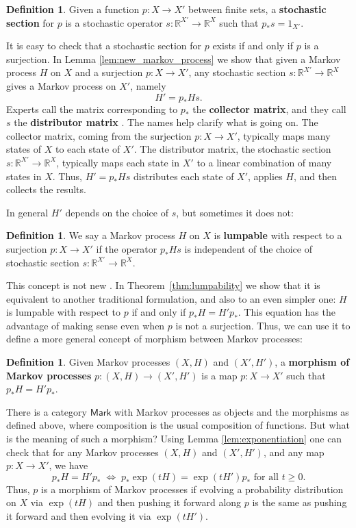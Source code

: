 \documentclass[oneside,final]{ucr}
\theoremstyle{definition}
\newtheorem{definition}[theorem]{Definition}
\newcommand{\maps}{\colon}
\newcommand{\R}{\mathbb{R}}
\newcommand{\define}[1]{{\bf \boldmath #1}}
\newcommand{\Mark}{\mathsf{Mark}}
\begin{document}
{\begin{definition}
Given a function $p \maps X \to X'$ between finite sets, a \define{stochastic section} for
$p$ is a stochastic operator $s \maps \R^{X'} \to \R^X$ such that $p_* s = 1_{X'}$. 
\end{definition}

It is easy to check that a stochastic section for $p$ exists if and only if $p$ is a surjection.  In Lemma \ref{lem:new_markov_process} we show that given a Markov process $H$ on $X$ and a surjection $p \maps X \to X'$, any stochastic section $s \maps \R^{X'} \to \R^X$ gives a Markov process on $X'$, namely
\[            H' =  p_* H s. \]
Experts call the matrix corresponding to $p_*$ the \define{collector matrix}, and they call $s$ the \define{distributor matrix} \cite{Buchholz}.  The names help clarify what is going on.  The collector matrix, coming from the surjection $p \maps X \to X'$, typically maps many states of $X$ to each state of $X'$.  The distributor matrix, the stochastic section $s \maps \R^{X'} \to \R^X$, typically maps each state in $X'$ to a linear combination of many states in $X$.  Thus, $H' = p_* H s$ distributes each state of $X'$, applies $H$, and then collects the results.

In general $H'$ depends on the choice of $s$, but sometimes it does not:

\begin{definition} 
We say a Markov process $H$ on $X$ is \define{lumpable} with respect to 
a surjection $p \maps X \to X'$ if the operator $p_* H s$ is independent of the choice of stochastic section $s \maps \R^{X'} \to \R^X$.
\end{definition}

This concept is not new \cite{Buchholz}.   In Theorem\ \ref{thm:lumpability} we show that it is equivalent to another traditional formulation, and also to an even simpler one: $H$ is lumpable with respect to $p$ if and only if $p_* H = H' p_*$.    This equation has the advantage of making sense even when $p$ is not a surjection.   Thus, we can use it to define a more general concept of morphism between Markov processes:

\begin{definition}  
Given Markov processes $(X,H)$ and $(X',H')$, a \define{morphism of Markov
processes} $p \maps (X,H) \to (X',H')$ is a map $p \maps X \to X'$ such that
$p_* H = H' p_*$.  
\end{definition}

There is a category $\Mark$ with Markov processes as objects and the morphisms as defined above, where composition is the usual composition of functions.  But what is the meaning of such a morphism?   Using Lemma \ref{lem:exponentiation} one can check that for any Markov processes $(X,H)$ and $(X',H')$, and any map
$p \maps X \to X'$, we have
\[    p_* H = H' p_* \; \iff \;  p_* \exp(tH) = \exp(tH') p_* \textrm{ for all } t \ge 0.\]
Thus, $p$ is a morphism of Markov processes if evolving a probability distribution
on $X$ via $\exp(tH)$ and then pushing it forward along $p$ is the same as
pushing it forward and then evolving it via $\exp(tH')$.  

}
\end{document}

